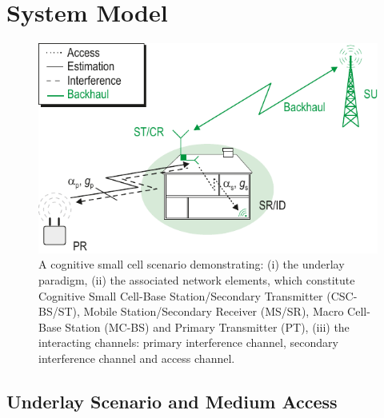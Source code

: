 \section{System Model} \label{sec_US:sys_mod}
\begin{figure}[!ht]
\centering
\includegraphics[width = \figscalet]{figures/CR_Scenario_Underlay}
\caption{A cognitive small cell scenario demonstrating: (i) the underlay paradigm, (ii) the associated network elements, which constitute Cognitive Small Cell-Base Station/Secondary Transmitter (CSC-BS/ST), Mobile Station/Secondary Receiver (MS/SR), Macro Cell-Base Station (MC-BS) and Primary Transmitter (PT), (iii) the interacting channels: primary interference channel, secondary interference channel and access channel.}
\label{fig_US:scenario}
\end{figure}

\subsection{Underlay Scenario and Medium Access}

